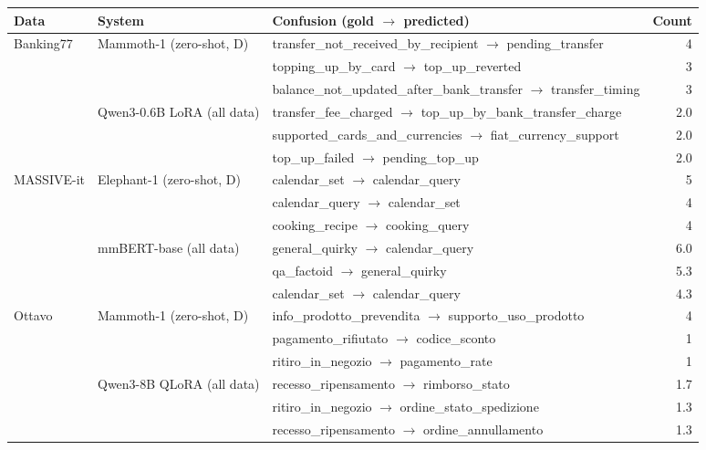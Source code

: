 \begin{tabular}{ll>{\raggedright\arraybackslash}p{7.7cm}r}
\toprule
Data & System & Confusion (gold $\to$ predicted) & Count \\
\midrule
Banking77 & Mammoth-1 (zero-shot, D) & transfer\_\allowbreak{}not\_\allowbreak{}received\_\allowbreak{}by\_\allowbreak{}recipient $\to$ pending\_\allowbreak{}transfer & 4 \\
 &  & topping\_\allowbreak{}up\_\allowbreak{}by\_\allowbreak{}card $\to$ top\_\allowbreak{}up\_\allowbreak{}reverted & 3 \\
 &  & balance\_\allowbreak{}not\_\allowbreak{}updated\_\allowbreak{}after\_\allowbreak{}bank\_\allowbreak{}transfer $\to$ transfer\_\allowbreak{}timing & 3 \\
 & Qwen3-0.6B LoRA (all data) & transfer\_\allowbreak{}fee\_\allowbreak{}charged $\to$ top\_\allowbreak{}up\_\allowbreak{}by\_\allowbreak{}bank\_\allowbreak{}transfer\_\allowbreak{}charge & 2.0 \\
 &  & supported\_\allowbreak{}cards\_\allowbreak{}and\_\allowbreak{}currencies $\to$ fiat\_\allowbreak{}currency\_\allowbreak{}support & 2.0 \\
 &  & top\_\allowbreak{}up\_\allowbreak{}failed $\to$ pending\_\allowbreak{}top\_\allowbreak{}up & 2.0 \\
\midrule
MASSIVE-it & Elephant-1 (zero-shot, D) & calendar\_\allowbreak{}set $\to$ calendar\_\allowbreak{}query & 5 \\
 &  & calendar\_\allowbreak{}query $\to$ calendar\_\allowbreak{}set & 4 \\
 &  & cooking\_\allowbreak{}recipe $\to$ cooking\_\allowbreak{}query & 4 \\
 & mmBERT-base (all data) & general\_\allowbreak{}quirky $\to$ calendar\_\allowbreak{}query & 6.0 \\
 &  & qa\_\allowbreak{}factoid $\to$ general\_\allowbreak{}quirky & 5.3 \\
 &  & calendar\_\allowbreak{}set $\to$ calendar\_\allowbreak{}query & 4.3 \\
\midrule
Ottavo & Mammoth-1 (zero-shot, D) & info\_\allowbreak{}prodotto\_\allowbreak{}prevendita $\to$ supporto\_\allowbreak{}uso\_\allowbreak{}prodotto & 4 \\
 &  & pagamento\_\allowbreak{}rifiutato $\to$ codice\_\allowbreak{}sconto & 1 \\
 &  & ritiro\_\allowbreak{}in\_\allowbreak{}negozio $\to$ pagamento\_\allowbreak{}rate & 1 \\
 & Qwen3-8B QLoRA (all data) & recesso\_\allowbreak{}ripensamento $\to$ rimborso\_\allowbreak{}stato & 1.7 \\
 &  & ritiro\_\allowbreak{}in\_\allowbreak{}negozio $\to$ ordine\_\allowbreak{}stato\_\allowbreak{}spedizione & 1.3 \\
 &  & recesso\_\allowbreak{}ripensamento $\to$ ordine\_\allowbreak{}annullamento & 1.3 \\
\bottomrule
\end{tabular}